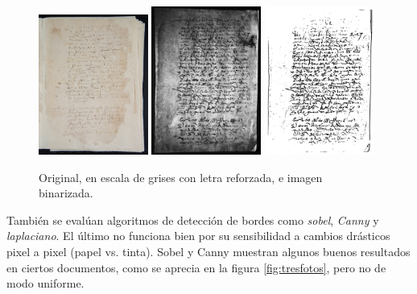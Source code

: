 \documentclass[11pt,a4paper]{article}
\begin{document}
\begin{figure}[h] 
\centering 
\begin{minipage}{1.0\textwidth} 
\includegraphics[width=0.32\textwidth]{original.jpg} 
\includegraphics[width=0.32\textwidth]{morph.jpg} 
\includegraphics[width=0.32\textwidth]{kraken.jpg} 
\caption{Original, en escala de grises con letra reforzada, e imagen binarizada.} 
\label{fig:tresfotosmodelo} 
\end{minipage} 
\end{figure}

También se evalúan algoritmos de detección de bordes como \textit{sobel}, \textit{Canny} y \textit{laplaciano}. El último no funciona bien por su sensibilidad a cambios drásticos pixel a pixel (papel vs. tinta). Sobel y Canny muestran algunos buenos resultados en ciertos documentos, como se aprecia en la figura \ref{fig:tresfotos}, pero no de modo uniforme.
\end{document}
